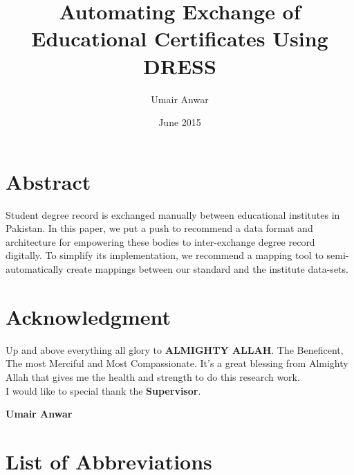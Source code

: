 \documentclass[12pt,a4paper,oneside]{book}
\title{Automating Exchange of Educational Certificates Using DRESS}
\author{Umair Anwar}
\date{June 2015}
\begin{document}
\maketitle


\chapter*{Abstract}

 Student degree record is exchanged manually between educational institutes in Pakistan. In this paper, we put a push to recommend a data format and architecture for empowering these bodies to inter-exchange degree record digitally. To simplify its implementation, we recommend a mapping tool to semi-automatically create mappings between our standard and the institute data-sets.

\certificateoforiginality
\chapter*{Acknowledgment}
Up and above everything all glory to {\bfseries ALMIGHTY ALLAH}. The Beneficent, The most Merciful and Most Compassionate. It's a great blessing from Almighty Allah that gives me the health and strength to do this research work.\\

I would like to special thank the {\bfseries Supervisor}. \\

\begin{flushright} \textbf{Umair Anwar} \end{flushright}

\tableofcontents
%
%
%
\chapter*{List of Abbreviations}
\end{document}
